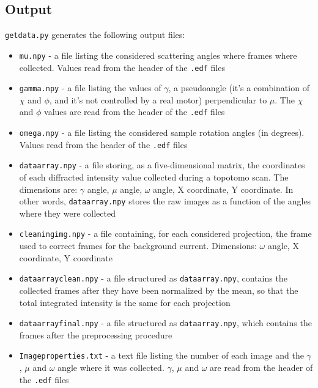 \documentclass[11pt]{scrartcl}
\begin{document}
\subsection{Output}

{\texttt{getdata.py}} generates the following output files:

\begin{itemize}
    \item {\texttt{mu.npy}} - a file listing the considered scattering angles where frames where collected. Values read from the header of the {\texttt{.edf}} files
    \item {\texttt{gamma.npy}} - a file listing the values of $\gamma$, a pseudoangle (it's a combination of $\chi$ and $\phi$, and it's not controlled by a real motor) perpendicular to $\mu$. The $\chi$ and $\phi$ values are read from the header of the {\texttt{.edf}} files
    \item {\texttt{omega.npy}} - a file listing the considered sample rotation angles (in degrees). Values read from the header of the {\texttt{.edf}} files
    \item {\texttt{dataarray.npy}} - a file storing, as a five-dimensional matrix, the coordinates of each diffracted intensity value collected during a topotomo scan. The dimensions are: $\gamma$ angle, $\mu$ angle, $\omega$ angle, X coordinate, Y coordinate. In other words, {\texttt{dataarray.npy}} stores the raw images as a function of the angles where they were collected
    \item {\texttt{cleaning\textunderscore img.npy}} - a file containing, for each considered projection, the frame used to correct frames for the background current. Dimensions: $\omega$ angle, {\footnotesize{X}} coordinate, {\footnotesize{Y}} coordinate
    \item {\texttt{dataarray\textunderscore clean.npy}} - a file structured as {\texttt{dataarray.npy}}, contains the collected frames after they have been normalized by the mean, so that the total integrated intensity is the same for each projection
    \item {\texttt{dataarray\textunderscore final.npy}} - a file structured as {\texttt{dataarray.npy}}, which contains the frames after the preprocessing procedure
    \item {\texttt{Image\textunderscore properties.txt}} - a text file listing the number of each image and the $\gamma$, $\mu$ and $\omega$ angle where it was collected. $\gamma$, $\mu$ and $\omega$ are read from the header of the {\texttt{.edf}} files
\end{itemize}
\end{document}
